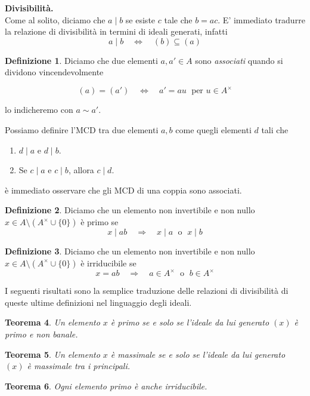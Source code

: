 \documentclass[a4paper]{article}
\newtheorem{theorem}{Teorema}[section]
\theoremstyle{remark}
\theoremstyle{definition}
\newtheorem{definition}[theorem]{Definizione}
\begin{document}
\begin{multicols}{2}
\columnbreak
\textbf{Divisibilità.}\\
Come al solito, diciamo che $ a \mid b $ se esiste $ c  $ tale che $ b = ac $. E' immediato tradurre la relazione di divisibilità in termini di ideali generati, infatti 
\[ a \mid b \quad\Leftrightarrow\quad (b) \subseteq (a) \]

\begin{definition}
	Diciamo che due elementi $ a, a' \in A $ sono \emph{associati} quando si dividono vincendevolmente

\[ (a) = (a') \quad\Leftrightarrow\quad a' = au \;\text{ per } u \in A^\times \]

lo indicheremo con $ a \sim a' $.
\end{definition}

Possiamo definire l'MCD tra due elementi $ a, b $ come quegli elementi $ d $ tali che
\begin{enumerate}
	\item $ d \mid a $ e $ d \mid b $.
	\item Se $ c \mid a $ e $ c \mid b $, allora $ c \mid d $.
\end{enumerate}
è immediato osservare che gli MCD di una coppia sono associati.

\begin{definition}
	Diciamo che un elemento non invertibile e non nullo $ x \in A\setminus(A^\times \cup \{0\}) $ è primo se \[ x \mid ab \quad\Rightarrow\quad x \mid a \; \text{ o }\; x \mid b \]
\end{definition}

\begin{definition}
	Diciamo che un elemento non invertibile e non nullo $ x \in A\setminus(A^\times \cup \{0\}) $ è irriducibile se \[ x = ab \quad\Rightarrow\quad a\in A^\times \; \text{ o }\; b \in A^\times \]
\end{definition}

I seguenti risultati sono la semplice traduzione delle relazioni di divisibilità di queste ultime definizioni nel linguaggio degli ideali.

\begin{theorem}\label{prpr}
	Un elemento $ x $ è primo se e solo se l'ideale da lui generato $ (x) $ è primo e non banale.
\end{theorem}

\begin{theorem}\label{mama}
	Un elemento $ x $ è massimale se e solo se l'ideale da lui generato $ (x) $ è massimale tra i principali.
\end{theorem}

\begin{theorem}\label{epei}
	Ogni elemento primo è anche irriducibile. 
\end{theorem}

\end{multicols}
\end{document}
